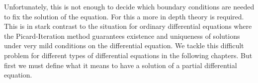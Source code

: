 Unfortunately, this is not enough to decide which boundary conditions are needed
to fix the solution of the equation.
For this a more in depth theory is required.
This is in stark contrast to the situation for ordinary differential
equations where the Picard-Iteration method guarantees existence and
uniqueness of solutions under very mild conditions on the differential
equation.
We tackle this difficult problem for different types of differential
equations in the following chapters.
But first we must define what it means to have a solution of a partial
differential equation.
